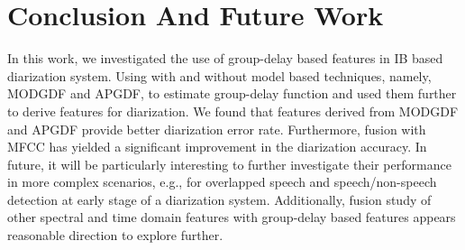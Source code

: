 \documentclass[conference]{IEEEtran}
\begin{document}
\section{Conclusion And Future Work}
\label{conclude}
In this work, we investigated the use of group-delay based features in IB based
diarization system. Using with and without model based techniques, namely,
MODGDF and APGDF, to estimate group-delay function and used them further to
derive features for diarization. We found that features derived from MODGDF and
APGDF provide better diarization error rate. Furthermore, fusion with MFCC has
yielded a significant improvement in the diarization accuracy.  In future, it
will be particularly interesting to further investigate their performance in
more complex scenarios, e.g., for overlapped speech and speech/non-speech
detection at early stage of a diarization system. Additionally, fusion study of
other spectral and time domain features with group-delay based features appears
reasonable direction to explore further. 



\end{document}
